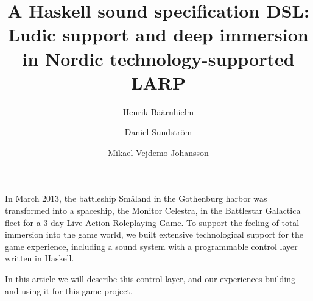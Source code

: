 \documentclass{tmr}
\title{A Haskell sound specification DSL: Ludic support and deep immersion in Nordic technology-supported LARP}
\author{Henrik Bäärnhielm\email{redstar@kth.se}}
\author{Daniel Sundström\email{daniel@monkeydancers.com}}
\author{Mikael Vejdemo-Johansson\email{mikael@johanssons.org}}
\begin{document}
\begin{introduction}
  In March 2013, the battleship Småland in the Gothenburg harbor was
  transformed into a spaceship, the Monitor Celestra, in the
  Battlestar Galactica fleet for a 3 day Live Action Roleplaying
  Game. To support the feeling of total immersion into the game world,
  we built extensive technological support for the game experience,
  including a sound system with a programmable control layer written
  in Haskell. 

  In this article we will describe this control layer, and our
  experiences building and using it for this game project.
\end{introduction}
















%
%

\end{document}
